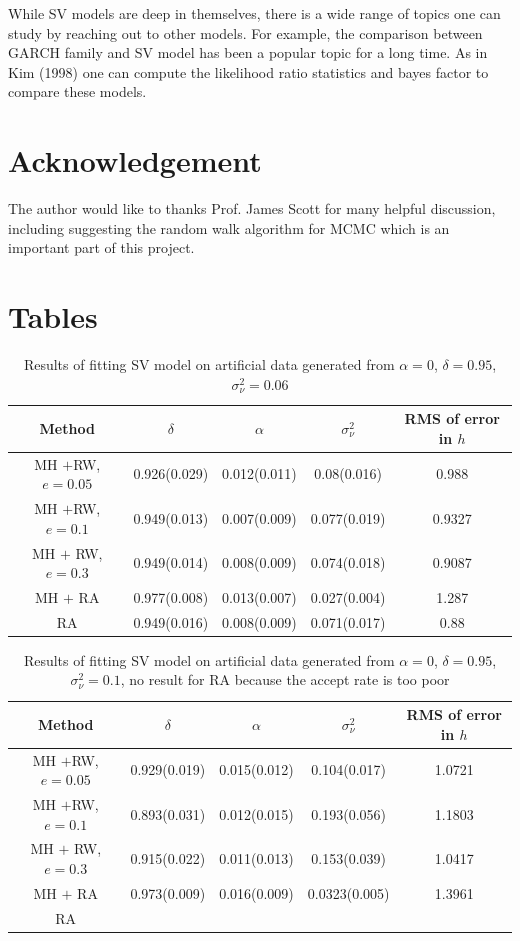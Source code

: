 \documentclass{article}
\begin{document}
While SV models are deep in themselves, there is a wide range of topics one can study by reaching out to other models. For example, the comparison between GARCH family and SV model has been a popular topic for a long time. As in Kim (1998) one can compute the likelihood ratio statistics and bayes factor to compare these models.
\section{Acknowledgement}
The author would like to thanks Prof. James Scott for many helpful discussion, including suggesting the random walk algorithm for MCMC which is an important part of this project.
\section{Tables}

\begin{table}[H]
\centering
\begin{tabular}{|c|c|c|c|c|}
\hline
Method& $\delta$ & $\alpha$& $\sigma_\nu^2$ & RMS of error in $h$ \\
\hline
MH $+$RW, $e=0.05$ & 0.926(0.029) & 0.012(0.011) &0.08(0.016)&0.988 \\
\hline
MH $+$RW,$e=0.1$& 0.949(0.013) & 0.007(0.009)  &0.077(0.019) &0.9327\\
\hline
MH $+$ RW, $e=0.3$ & 0.949(0.014) &  0.008(0.009) & 0.074(0.018) &0.9087\\
\hline
MH $+$ RA &  0.977(0.008) & 0.013(0.007) & 0.027(0.004) & 1.287\\
\hline
RA& 0.949(0.016) & 0.008(0.009) &0.071(0.017)& 0.88\\
\hline
\end{tabular}
\caption{Results of fitting SV model on artificial data generated from $\alpha=0$, $\delta=0.95$, $\sigma_\nu^2=0.06$}\label{11}
\end{table}


\begin{table}[H]
\centering
\begin{tabular}{|c|c|c|c|c|}
\hline
Method& $\delta$ & $\alpha$& $\sigma_\nu^2$ & RMS of error in $h$ \\
\hline
MH $+$RW, $e=0.05$ & 0.929(0.019) & 0.015(0.012) & 0.104(0.017)&1.0721 \\
\hline
MH $+$RW,$e=0.1$& 0.893(0.031) & 0.012(0.015)  &0.193(0.056) &1.1803\\
\hline
MH $+$ RW, $e=0.3$ & 0.915(0.022) &  0.011(0.013) & 0.153(0.039) &1.0417\\
\hline
MH $+$ RA &  0.973(0.009) & 0.016(0.009) & 0.0323(0.005) & 1.3961\\
\hline
RA&  &  && \\
\hline
\end{tabular}
\caption{Results of fitting SV model on artificial data generated from $\alpha=0$, $\delta=0.95$, $\sigma_\nu^2=0.1$, no result for RA because the accept rate is too poor}\label{10}
\end{table}
\end{document}
